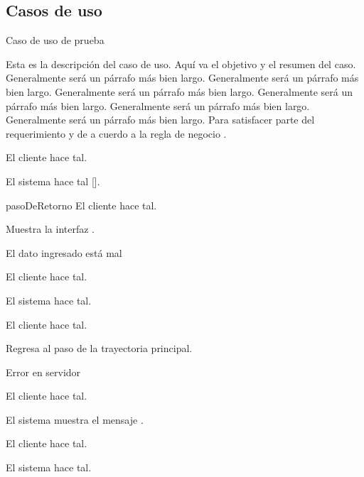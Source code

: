 %
%
%

\subsection{Casos de uso}

{Caso de uso de prueba}     %
{
  Esta es la descripción del caso de uso. Aquí va el objetivo y el resumen del
  caso. Generalmente será un párrafo más bien largo. Generalmente será un
  párrafo más bien largo. Generalmente será un párrafo más bien largo.
  Generalmente será un párrafo más bien largo. Generalmente será un párrafo más
  bien largo. Generalmente será un párrafo más bien largo. Para satisfacer parte
  del requerimiento  y de a cuerdo a la regla de
  negocio .

  \begin{trayectoriaPrincipal}
    \item El cliente hace tal.
    \item El sistema hace tal [].
    \item[pasoDeRetorno] El cliente hace tal.
    \item Muestra la interfaz .
  \end{trayectoriaPrincipal}

  \begin{trayectoriaAlternativa}[ta:errorEnTal]  %
    {El dato ingresado está mal}                 %
    \item El cliente hace tal.
    \item El sistema hace tal.
    \item El cliente hace tal.
    \item Regresa al paso  de la trayectoria
      principal.
  \end{trayectoriaAlternativa}

  \begin{trayectoriaAlternativa}[ta:errorEnTalDOS]
    {Error en servidor}
    \item El cliente hace tal.
    \item El sistema muestra el mensaje .
    \item El cliente hace tal.
    \item El sistema hace tal.
  \end{trayectoriaAlternativa}
}

